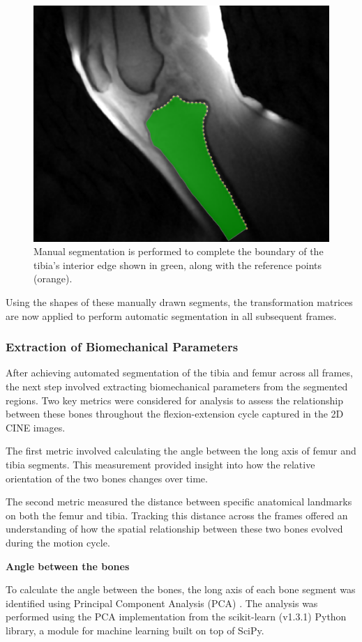 \documentclass{micro-econ-thesis}
\begin{document}
\begin{figure} [H]
	\centering
	\includegraphics[width=0.7\linewidth]{manual_segment}
	\caption{Manual segmentation is performed to complete the boundary of the tibia's interior edge shown in green, along with the reference points (orange).}
	\label{fig:manualsegment}
\end{figure}

Using the shapes of these manually drawn segments, the transformation matrices are now applied to perform automatic segmentation in all subsequent frames. 

\subsubsection{Extraction of Biomechanical Parameters}
After achieving automated segmentation of the tibia and femur across all frames, the next step involved extracting biomechanical parameters from the segmented regions. Two key metrics were considered for analysis to assess the relationship between these bones throughout the flexion-extension cycle captured in the 2D CINE images.

The first metric involved calculating the angle between the long axis of femur and tibia segments. This measurement provided insight into how the relative orientation of the two bones changes over time.

The second metric measured the distance between specific anatomical landmarks on both the femur and tibia. Tracking this distance across the frames offered an understanding of how the spatial relationship between these two bones evolved during the motion cycle. 

\textbf{Angle between the bones}

To calculate the angle between the bones, the long axis of each bone segment was identified using Principal Component Analysis (PCA) \parencite{jolliffe_principal_2004}. The analysis was performed using the PCA implementation from the scikit-learn (v1.3.1) Python library, a module for machine learning built on top of SciPy.
\end{document}
